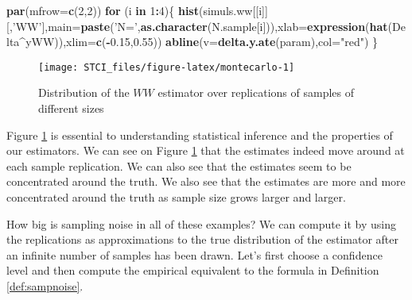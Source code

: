 \documentclass[]{book}
\newenvironment{Shaded}{\begin{snugshade}}{\end{snugshade}}
\newcommand{\KeywordTok}[1]{\textcolor[rgb]{0.13,0.29,0.53}{\textbf{#1}}}
\newcommand{\DataTypeTok}[1]{\textcolor[rgb]{0.13,0.29,0.53}{#1}}
\newcommand{\DecValTok}[1]{\textcolor[rgb]{0.00,0.00,0.81}{#1}}
\newcommand{\FloatTok}[1]{\textcolor[rgb]{0.00,0.00,0.81}{#1}}
\newcommand{\StringTok}[1]{\textcolor[rgb]{0.31,0.60,0.02}{#1}}
\newcommand{\ControlFlowTok}[1]{\textcolor[rgb]{0.13,0.29,0.53}{\textbf{#1}}}
\newcommand{\OperatorTok}[1]{\textcolor[rgb]{0.81,0.36,0.00}{\textbf{#1}}}
\newcommand{\NormalTok}[1]{#1}
\theoremstyle{definition}
\theoremstyle{definition}
\theoremstyle{definition}
\theoremstyle{remark}
\begin{document}
\begin{Shaded}
\begin{Highlighting}[]
\KeywordTok{par}\NormalTok{(}\DataTypeTok{mfrow=}\KeywordTok{c}\NormalTok{(}\DecValTok{2}\NormalTok{,}\DecValTok{2}\NormalTok{))}
\ControlFlowTok{for}\NormalTok{ (i }\ControlFlowTok{in} \DecValTok{1}\OperatorTok{:}\DecValTok{4}\NormalTok{)\{}
  \KeywordTok{hist}\NormalTok{(simuls.ww[[i]][,}\StringTok{'WW'}\NormalTok{],}\DataTypeTok{main=}\KeywordTok{paste}\NormalTok{(}\StringTok{'N='}\NormalTok{,}\KeywordTok{as.character}\NormalTok{(N.sample[i])),}\DataTypeTok{xlab=}\KeywordTok{expression}\NormalTok{(}\KeywordTok{hat}\NormalTok{(Delta}\OperatorTok{^}\NormalTok{yWW)),}\DataTypeTok{xlim=}\KeywordTok{c}\NormalTok{(}\OperatorTok{-}\FloatTok{0.15}\NormalTok{,}\FloatTok{0.55}\NormalTok{))}
  \KeywordTok{abline}\NormalTok{(}\DataTypeTok{v=}\KeywordTok{delta.y.ate}\NormalTok{(param),}\DataTypeTok{col=}\StringTok{"red"}\NormalTok{)}
\NormalTok{\}}
\end{Highlighting}
\end{Shaded}

\begin{figure}[htbp]

{\centering \texttt{[image: STCI\_files/figure-latex/montecarlo-1]} 

}

\caption{Distribution of the $WW$ estimator over replications of samples of different sizes}\label{fig:montecarlo}
\end{figure}

Figure \ref{fig:montecarlo} is essential to understanding statistical
inference and the properties of our estimators. We can see on Figure
\ref{fig:montecarlo} that the estimates indeed move around at each
sample replication. We can also see that the estimates seem to be
concentrated around the truth. We also see that the estimates are more
and more concentrated around the truth as sample size grows larger and
larger.

How big is sampling noise in all of these examples? We can compute it by
using the replications as approximations to the true distribution of the
estimator after an infinite number of samples has been drawn. Let's
first choose a confidence level and then compute the empirical
equivalent to the formula in Definition \ref{def:sampnoise}.
\end{document}
